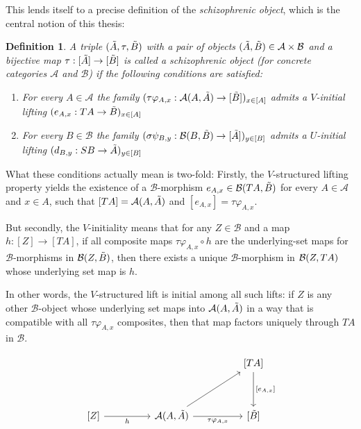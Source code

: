 \documentclass[12pt,a4paper]{article}
\newtheorem{definition}{Definition}[section] %
\def\HomA{\ensuremath\mathcal{A}}
\def\HomB{\ensuremath\mathcal{B}}
\def\t{\ensuremath\tilde}
\begin{document}
This lends itself to a precise definition of the \emph{schizophrenic object}, which is the central notion of this thesis:

\begin{definition}
	A triple $(\t A, \tau, \t B)$ with a pair of objects $(\t A, \t B) \in \mathcal{A} \times \mathcal{B}$ and a bijective map $\tau: [\t A] \to [\t B]$ is called a \emph{schizophrenic object} (for concrete categories $\mathcal{A}$ and $\mathcal{B}$) if the following conditions are satisfied:
	\begin{enumerate}
		\item[SO1.] For every $A \in \mathcal{A}$ the family $(\tau\varphi_{A,x}: \HomA(A, \t A) \to [\t B])_{x \in [A]}$ admits a $V$-initial lifting $(e_{A,x}:TA \to \t B)_{x \in [A]}$
		\item[SO2.] For every $B \in \mathcal{B}$ the family $(\sigma\psi_{B,y}: \HomB(B, \t B) \to [\t A])_{y \in [B]}$ admits a $U$-initial lifting $(d_{B,y}:SB \to \t A)_{y \in [B]}$
	\end{enumerate}
\end{definition}

What these conditions actually mean is two-fold: Firstly, the $V$-structured lifting property yields the existence of  a $\mathcal{B}$-morphism $e_{A,x} \in \HomB(TA, \t B)$ for every $A \in \mathcal{A}$ and $x \in A$, such that $[TA] = \HomA(A, \t A)$ and $[e_{A,x}] = \tau \varphi_{A,x}$.

But secondly,  the $V$-initiality means that for any $Z \in \mathcal{B}$ and a map $h: [Z] \to [TA]$, if  all composite maps $\tau \varphi_{A,x} \circ h$ are the underlying-set maps for $\mathcal{B}$-morphisms in $\HomB(Z, \t B)$, then there exists a unique $\mathcal{B}$-morphism in $\HomB(Z, TA)$  whose underlying set map is $h$.

In other words, the $V$-structured lift is initial among all such lifts: if $Z$ is any other $\mathcal{B}$-object whose underlying set maps into $\HomA(A, \t A)$ in a way that is compatible with all $\tau \varphi_{A,x}$ composites, then that map factors uniquely through $TA$ in $\mathcal{B}$. 



\[\begin{tikzcd}
	&&&& {[TA]} \\
	\\
	{[Z]} && {\HomA(A, \t A)} && {[\t B]}
	\arrow["{[e_{A,x}]}", from=1-5, to=3-5]
	\arrow["h"', from=3-1, to=3-3]
	\arrow[from=3-3, to=1-5]
	\arrow["{\tau \varphi_{A,x}}"', from=3-3, to=3-5]
\end{tikzcd}\]
\end{document}
